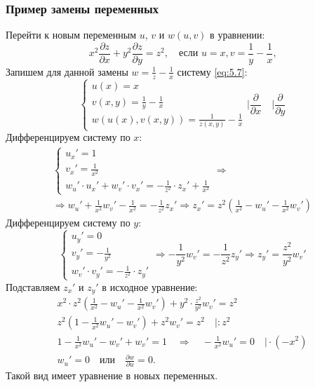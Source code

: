 \subsubsection*{Пример замены переменных}
	Перейти к новым переменным $u$, $v$ и $w(u,v)$ в уравнении:
	\begin{equation*}
		x^2 \frac{\partial z}{\partial x} + y^2 \frac{\partial z}{\partial y} = z^2, \quad \text{если $u=x, v = \frac{1}{y} - \frac{1}{x}$,}
	\end{equation*}
	Запишем для данной замены $w = \frac{1}{z} - \frac{1}{x}$ систему \cref{eq:5.7}:
	\begin{equation*}
		\begin{cases}
			u(x) = x\\
			v(x,y) = \frac{1}{y} - \frac{1}{x}\\
			w(u(x), v(x,y)) = \frac{1}{z(x,y)} - \frac{1}{x}
		\end{cases}
		\Bigg|\frac{\partial}{\partial x} \quad \Bigg| \frac{\partial}{\partial y}
	\end{equation*}
	Дифференцируем систему по $x$:
	\begin{multline*}
		\begin{cases}
			u_x' = 1\\
			v_x' = \frac{1}{x^2}\\
			w_u' \cdot u_x' + w_v' \cdot v_x' = -\frac{1}{z^2} \cdot z_x' + \frac{1}{x^2}
		\end{cases} \Rightarrow\\\Rightarrow w_u' + \frac{1}{x^2} w_v' - \frac{1}{x^2} = - \frac{1}{z^2} z_x' \Rightarrow z_x' = z^2\left(\frac{1}{x^2} - w_u' - \frac{1}{x^2} w_v'\right)
	\end{multline*}
	Дифференцируем систему по $y$:
	\begin{equation*}
		\begin{cases}
			u_y' = 0\\
			v_y' = -\frac{1}{y^2}\\
			w_v' \cdot v_y' = -\frac{1}{z^2} \cdot z_y'
		\end{cases}
		\Rightarrow -\frac{1}{y^2} w_v' = -\frac{1}{z^2} z_y' \Rightarrow z_y' = \frac{z^2}{y^2} w_v'
	\end{equation*}
	Подставляем $z_x'$ и $z_y'$ в исходное уравнение:
	\begin{equation*}
		\begin{split}
			x^2 \cdot z^2 \left(\frac{1}{x^2} - w_u' - \frac{1}{x^2} w_v'\right) + y^2 \cdot \frac{z^2}{y^2} w_v' = z^2\\
			z^2\left(1 - \frac{1}{x^2} w_u' - w_v'\right) + z^2 w_v' = z^2 \quad \Big| : z^2\\
			1 - \frac{1}{x^2}w_u' - w_v' + w_v' = 1 \quad \Rightarrow \quad -\frac{1}{x^2} w_u' = 0 \quad \Big| \cdot (-x^2)\\
			w_u' = 0 \quad \text{или} \quad \frac{\partial w}{\partial u} = 0.
		\end{split}
	\end{equation*}
	Такой вид имеет уравнение в новых переменных.



